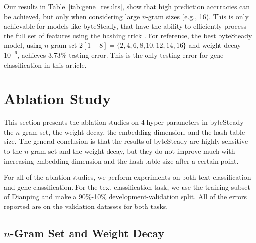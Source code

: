 \documentclass[sigconf,review, anonymous]{acmart}
\begin{document}
Our results in Table~\ref{tab:gene_results}, show that high prediction accuracies can be achieved, but only when considering large $n$-gram sizes (e.g., 16). This is only achievable for models like byteSteady, that have the ability to efficiently process the full set of features using the hashing trick \cite{WDLSA09}. For reference, the best byteSteady model, using \(n\)-gram set \(2[1-8] = \{2,4,6,8,10,12,14,16\}\) and weight decay \(10^{-6}\), achieves 3.73\% testing error. This is the only testing error for gene classification in this article.

\section{Ablation Study}

This section presents the ablation studies on 4 hyper-parameters in byteSteady - the \(n\)-gram set, the weight decay, the embedding dimension, and the hash table size. The general conclusion is that the results of byteSteady are highly sensitive to the \(n\)-gram set and the weight decay, but they do not improve much with increasing embedding dimension and the hash table size after a certain point.

For all of the ablation studies, we perform experiments on both text classification and gene classification. For the text classification task, we use the training subset of Dianping and make a 90\%-10\% development-validation split. All of the errors reported are on the validation datasets for both tasks.

\subsection{\(n\)-Gram Set and Weight Decay}
\end{document}
